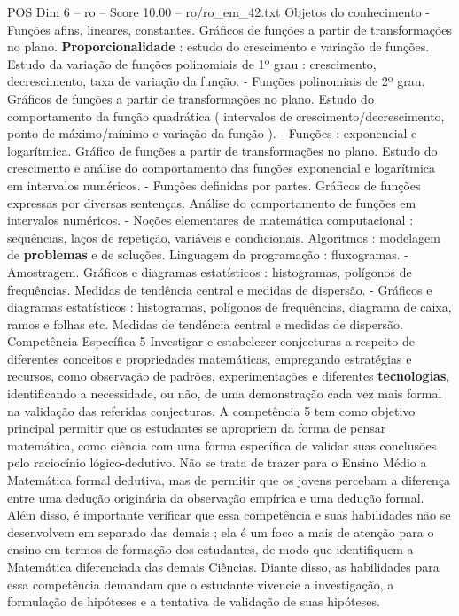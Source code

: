 \begin{textsample}{POS Dim 6 – ro – Score 10.00 – ro/ro\_em\_42.txt}
Objetos do conhecimento - Funções afins, lineares, constantes.
Gráficos de funções a partir de transformações no plano. \textbf{Proporcionalidade} : estudo do crescimento e variação de funções.
Estudo da variação de funções polinomiais de 1º grau : crescimento, decrescimento, taxa de variação da função. - Funções polinomiais de 2º grau.
Gráficos de funções a partir de transformações no plano.
Estudo do comportamento da função quadrática ( intervalos de crescimento/decrescimento, ponto de máximo/mínimo e variação da função ). - Funções : exponencial e logarítmica.
Gráfico de funções a partir de transformações no plano.
Estudo do crescimento e análise do comportamento das funções exponencial e logarítmica em intervalos numéricos. - Funções definidas por partes.
Gráficos de funções expressas por diversas sentenças.
Análise do comportamento de funções em intervalos numéricos. - Noções elementares de matemática computacional : sequências, laços de repetição, variáveis e condicionais.
Algoritmos : modelagem de \textbf{problemas} e de soluções.
Linguagem da programação : fluxogramas. - Amostragem.
Gráficos e diagramas estatísticos : histogramas, polígonos de frequências.
Medidas de tendência central e medidas de dispersão. - Gráficos e diagramas estatísticos : histogramas, polígonos de frequências, diagrama de caixa, ramos e folhas etc.
Medidas de tendência central e medidas de dispersão.
Competência Específica 5 Investigar e estabelecer conjecturas a respeito de diferentes conceitos e propriedades matemáticas, empregando estratégias e recursos, como observação de padrões, experimentações e diferentes \textbf{tecnologias}, identificando a necessidade, ou não, de uma demonstração cada vez mais formal na validação das referidas conjecturas.
A competência 5 tem como objetivo principal permitir que os estudantes se apropriem da forma de pensar matemática, como ciência com uma forma específica de validar suas conclusões pelo raciocínio lógico-dedutivo.
Não se trata de trazer para o Ensino Médio a Matemática formal dedutiva, mas de permitir que os jovens percebam a diferença entre uma dedução originária da observação empírica e uma dedução formal.
Além disso, é importante verificar que essa competência e suas habilidades não se desenvolvem em separado das demais ; ela é um foco a mais de atenção para o ensino em termos de formação dos estudantes, de modo que identifiquem a Matemática diferenciada das demais Ciências.
Diante disso, as habilidades para essa competência demandam que o estudante vivencie a investigação, a formulação de hipóteses e a tentativa de validação de suas hipóteses.

\end{textsample}
